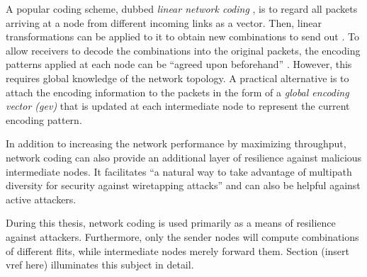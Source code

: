 A popular coding scheme, dubbed \textit{linear network coding} \cite{li03linearnc}, is to regard all packets arriving at a node from different incoming links as a vector.
Then, linear transformations can be applied to it to obtain new combinations to send out \cite[1]{li03linearnc}. To allow receivers to decode the
combinations into the original packets, the encoding patterns applied at each node can be \enquote{agreed upon beforehand} \cite[1]{li03linearnc}.
However, this requires global knowledge of the network topology. A practical alternative is to attach the encoding information to the packets in the
form of a \textit{global encoding vector (\gls{gev})} \cites[2\psqq]{chou03practicalnc}[5\psq]{chou07ncforinternetandwireless} that is updated at each intermediate node to
represent the current encoding pattern.

In addition to increasing the network performance by maximizing throughput, network coding can also provide an additional layer of resilience against
malicious intermediate nodes. It facilitates \enquote{a natural way to take advantage of multipath diversity for security against wiretapping attacks}
\cite[8]{fragouli07ncfundamentals} and can also be helpful against active attackers.

During this thesis, network coding is used primarily as a means of resilience against attackers. Furthermore, only the sender nodes will compute
combinations of different flits, while intermediate nodes merely forward them. Section (insert vref here) illuminates this subject in detail.
